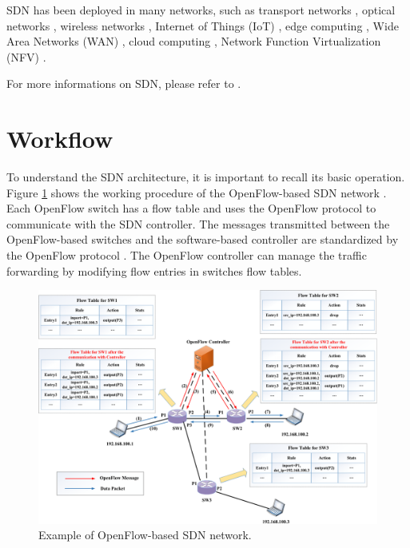 \begin{itemize}
SDN has been deployed in many networks, such as transport networks \cite{Alvizu2017}, optical networks \cite{Thyagaturu2016}, wireless networks \cite{Haque2016, Chen2015}, Internet of Things (IoT) \cite{Bera2017}, edge computing \cite{Baktir2017}, Wide Area Networks (WAN) \cite{Michel2017}, cloud computing \cite{Jain2013}, Network Function Virtualization (NFV) \cite{Li2015, Liang2015}.
\end{itemize}
For more informations on SDN, please refer to \cite{Nunes2014, Jarraya2014, Xia2015, Hu2014, Xie2015, Trois2016, Huang2017, Blenk2016}.


\section{Workflow}
To understand the SDN architecture, it is important to recall its basic operation. Figure \ref{fig:{WorkFlow}} shows the working procedure of the OpenFlow-based SDN network \cite{OFP13}. Each OpenFlow switch has a flow table and uses the OpenFlow protocol to communicate with the SDN controller. The messages transmitted between the OpenFlow-based switches and the software-based controller are standardized by the OpenFlow protocol \cite{Erickson2013}. The OpenFlow controller can manage the traffic forwarding by modifying flow entries in switches flow tables.
\begin{figure}[tb!]
	\centering
	\includegraphics[width=13cm]{figure/WorkFlow.png}
	\caption{Example of OpenFlow-based SDN network.}
	\label{fig:{WorkFlow}}
\end{figure}

